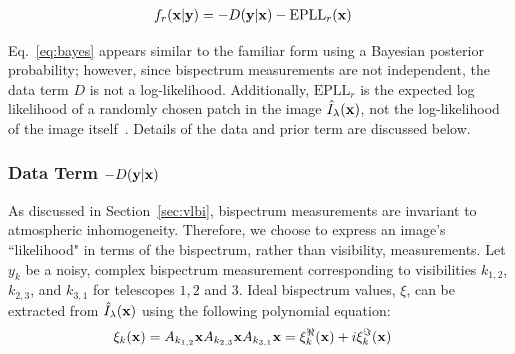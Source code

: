 {\begin{align} 
f_r({\bf x} | {\bf y} )
&=  - D ({\bf y}|{\bf x}) - \mbox{EPLL}_r({\bf x})
\label{eq:bayes}
\end{align}
 \vspace{-.2in}


Eq.~\ref{eq:bayes} appears similar to the familiar form using a Bayesian posterior probability; however, since bispectrum measurements are not independent, the data term $D$ is not a log-likelihood. Additionally, $\mbox{EPLL}_r$ is the expected log likelihood of a randomly chosen patch in the image $\hat{I}_{\lambda}({\bf x})$, not the log-likelihood of the image itself~\cite{zoran2011learning}. 
Details of the data and prior term are discussed below. 



\subsubsection{Data Term $- D ({\bf y}|{\bf x})$ }


As discussed in Section~\ref{sec:vlbi}, bispectrum measurements are invariant to atmospheric inhomogeneity. 
Therefore, we choose to express an image's ``likelihood" in terms of the bispectrum, rather than visibility, measurements. Let $y_k$ be a noisy, complex bispectrum measurement corresponding to visibilities $k_{1,2}$, $k_{2,3}$, and $k_{3,1}$ for telescopes $1,2$ and $3$. 
Ideal bispectrum values, $\xi$, can be extracted from $\hat{I}_{\lambda}({\bf x})$ using the following polynomial equation:
{\small 
	\begin{align}
	&\xi_k({\bf x}) =  A_{k_{1,2}} {\bf x}  A_{k_{2,3}}{\bf x}  A_{k_{3,1}}{\bf x}  = \xi_k^\Re({\bf x}) + i \xi_k^\Im({\bf x}) 
	\end{align}
}

}
